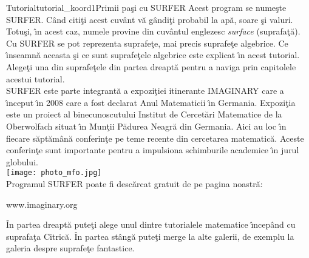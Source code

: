 \begin{surferIntroPage}{Tutorial}{tutorial_koord1}{Primii pa\c si cu SURFER}
Acest program se nume\c ste SURFER. C\^and citi\c ti acest cuv\^ant v\u a g\^andi\c ti probabil la ap\u a,
soare \c si valuri. Totu\c si, \^\i n acest caz, numele provine din cuv\^antul englezesc {\it surface} (suprafa\c t\u a).
\\
Cu SURFER se pot reprezenta suprafe\c te, mai precis suprafe\c te algebrice. Ce \^\i nseamn\u a aceasta
\c si ce sunt suprafe\c tele algebrice este explicat \^\i n acest tutorial. Alege\c ti una din suprafe\c tele din partea dreapt\u a pentru a naviga prin capitolele acestui tutorial.\\
SURFER este parte integrant\u a a expozi\c tiei itinerante IMAGINARY care a \^\i nceput \^\i n 2008 care a
fost declarat Anul Matematicii \^\i n Germania. Expozi\c tia este un proiect al binecunoscutului Institut
de Cercet\u ari Matematice de la Oberwolfach situat \^\i n Mun\c tii P\u adurea Neagr\u a din Germania. Aici au loc \^\i n fiecare s\u apt\u am\^an\u a conferin\c te pe teme recente din cercetarea matematic\u a. Aceste conferin\c te sunt importante pentru a impulsiona schimburile academice \^\i n jurul globului. \\
\vspace{0.2cm} \hspace{3.5cm}\texttt{[image: photo\_mfo.jpg]}\\
Programul SURFER poate fi desc\u arcat gratuit de pe pagina noastr\u a: \\
\begin{centering}
www.imaginary.org\\
\end{centering}
 \vspace{0.2cm}
\^In partea dreapt\u a pute\c ti alege unul dintre tutorialele matematice \^\i ncep\^and cu suprafa\c ta Citric\u a. \^In partea st\^ang\u a pute\c ti merge la alte galerii, de exemplu la galeria despre suprafe\c te fantastice.
\end{surferIntroPage}